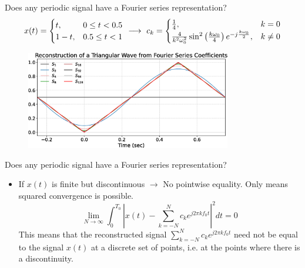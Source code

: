 \documentclass[aspectratio=169]{beamer}
\let\olditem\item
\renewcommand{\item}{\setlength{\itemsep}{\fill}\olditem}
\def\lp{\ensuremath\left(}
\def\rp{\ensuremath\right)}
\begin{document}
\begin{frame}[t]{Does any periodic signal have a Fourier series representation?}
\vspace{-0.5cm}
\[ x(t) = \begin{cases} t, & 0 \leq t < 0.5 \\
1 - t, & 0.5 \leq t < 1\end{cases} \,\, \longrightarrow \,\, c_k = \begin{cases} \frac{1}{4}, & k = 0 \\ \frac{4}{k^2\omega_0^2}\sin^2\lp \frac{k \omega_0}{4} \rp e^{-j\frac{k \omega_0}{2}},  & k \neq 0 \end{cases} \]

\begin{figure}
  \includegraphics[width=0.8\textwidth]{img/fs-triwave.eps}
  \end{figure}
\end{frame}


\begin{frame}[t]{Does any periodic signal have a Fourier series representation?}
\begin{itemize}
  \item If $x(t)$ is finite but discontinuous $\longrightarrow$ No pointwise equality. Only means squared convergence is possible.
  \[ \lim_{N \to \infty} \int_{0}^{T_0}\left|x(t) - \sum_{k=-N}^{N} c_k e^{j2\pi k f_0 t} \right|^2dt = 0 \]
  This means that the reconstructed signal $\sum_{k=-N}^{N} c_k e^{j2\pi k f_0 t}$ need not be equal to the signal $x(t)$ at a discrete set of points, i.e. at the points where there is a discontinuity.
\end{itemize}
\end{frame}
\end{document}
